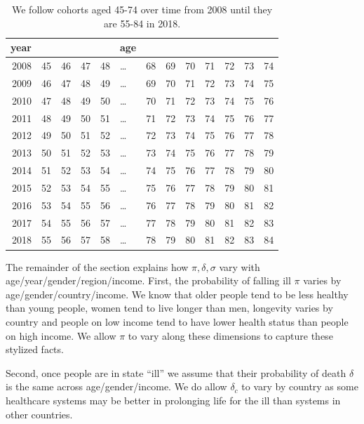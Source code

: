 \documentclass[a4paper,12pt]{article}
\begin{document}
\begin{table}[htbp]
\caption{\label{tab:yearages}We follow cohorts aged 45-74 over time from 2008 until they are 55-84 in 2018.}
\centering
\begin{tabular}{rrrrrlrrrrrrr}
year &  &  &  &  & age &  &  &  &  &  &  & \\
\hline
2008 & 45 & 46 & 47 & 48 & \ldots{} & 68 & 69 & 70 & 71 & 72 & 73 & 74\\
2009 & 46 & 47 & 48 & 49 & \ldots{} & 69 & 70 & 71 & 72 & 73 & 74 & 75\\
2010 & 47 & 48 & 49 & 50 & \ldots{} & 70 & 71 & 72 & 73 & 74 & 75 & 76\\
2011 & 48 & 49 & 50 & 51 & \ldots{} & 71 & 72 & 73 & 74 & 75 & 76 & 77\\
2012 & 49 & 50 & 51 & 52 & \ldots{} & 72 & 73 & 74 & 75 & 76 & 77 & 78\\
2013 & 50 & 51 & 52 & 53 & \ldots{} & 73 & 74 & 75 & 76 & 77 & 78 & 79\\
2014 & 51 & 52 & 53 & 54 & \ldots{} & 74 & 75 & 76 & 77 & 78 & 79 & 80\\
2015 & 52 & 53 & 54 & 55 & \ldots{} & 75 & 76 & 77 & 78 & 79 & 80 & 81\\
2016 & 53 & 54 & 55 & 56 & \ldots{} & 76 & 77 & 78 & 79 & 80 & 81 & 82\\
2017 & 54 & 55 & 56 & 57 & \ldots{} & 77 & 78 & 79 & 80 & 81 & 82 & 83\\
2018 & 55 & 56 & 57 & 58 & \ldots{} & 78 & 79 & 80 & 81 & 82 & 83 & 84\\
\end{tabular}
\end{table}


The remainder of the section explains how \(\pi,\delta,\sigma\) vary with age/year/gender/region/income. First, the probability of falling ill \(\pi\) varies by age/gender/country/income. We know that older people tend to be less healthy than young people, women tend to live longer than men, longevity varies by country and people on low income tend to have lower health status than people on high income. We allow \(\pi\) to vary along these dimensions to capture these stylized facts. 

Second, once people are in state ``ill'' we assume that their probability of death \(\delta\) is the same across age/gender/income. We do allow \(\delta_c\) to vary by country as some healthcare systems may be better in prolonging life for the ill than systems in other countries.
\end{document}
